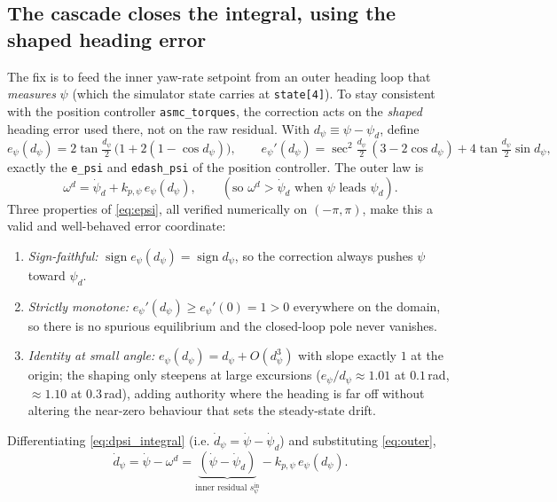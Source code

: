 \documentclass[11pt]{article}
\theoremstyle{plain}
\theoremstyle{definition}
\begin{document}
\subsection{The cascade closes the integral, using the shaped heading error}
\label{sec:cascade}
The fix is to feed the inner yaw-rate setpoint from an outer heading loop that
\emph{measures} $\psi$ (which the simulator state carries at \texttt{state[4]}). To stay
consistent with the position controller \texttt{asmc\_torques}, the correction acts on
the \emph{shaped} heading error used there, not on the raw residual. With
$d_\psi\equiv\psi-\psi_d$, define
\begin{equation}
e_\psi(d_\psi)=2\tan\!\tfrac{d_\psi}{2}\,\big(1+2(1-\cos d_\psi)\big),
\qquad
e_\psi'(d_\psi)=\sec^2\!\tfrac{d_\psi}{2}\,(3-2\cos d_\psi)+4\tan\!\tfrac{d_\psi}{2}\sin d_\psi,
\label{eq:epsi}
\end{equation}
exactly the \texttt{e\_psi} and \texttt{edash\_psi} of the position controller. The
outer law is
\begin{equation}
\omega^d=\dot\psi_d+k_{p,\psi}\,e_\psi(d_\psi),
\qquad(\text{so } \omega^d>\dot\psi_d \text{ when } \psi \text{ leads } \psi_d).
\label{eq:outer}
\end{equation}
Three properties of \eqref{eq:epsi}, all verified numerically on $(-\pi,\pi)$, make this
a valid and well-behaved error coordinate:
\begin{enumerate}[leftmargin=2em]
\item \emph{Sign-faithful:} $\operatorname{sign}e_\psi(d_\psi)=\operatorname{sign}d_\psi$,
so the correction always pushes $\psi$ toward $\psi_d$.
\item \emph{Strictly monotone:} $e_\psi'(d_\psi)\ge e_\psi'(0)=1>0$ everywhere on the
domain, so there is no spurious equilibrium and the closed-loop pole never vanishes.
\item \emph{Identity at small angle:} $e_\psi(d_\psi)=d_\psi+O(d_\psi^3)$ with slope
exactly $1$ at the origin; the shaping only steepens at large excursions
($e_\psi/d_\psi\approx1.01$ at $0.1\,$rad, $\approx1.10$ at $0.3\,$rad), adding authority
where the heading is far off without altering the near-zero behaviour that sets the
steady-state drift.
\end{enumerate}
Differentiating \eqref{eq:dpsi_integral} (i.e. $\dot d_\psi=\dot\psi-\dot\psi_d$) and
substituting \eqref{eq:outer},
\begin{equation}
\dot d_\psi=\dot\psi-\omega^d
=\underbrace{(\dot\psi-\dot\psi_d)}_{\text{inner residual }s_\psi^{\mathrm{in}}}
-k_{p,\psi}\,e_\psi(d_\psi).
\label{eq:dpsi_closed}
\end{equation}
\end{document}
